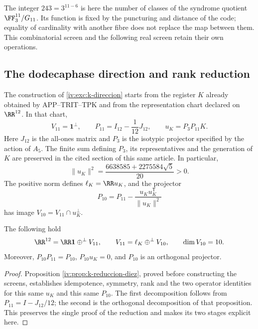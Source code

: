 The integer \(243=3^{11-6}\) is here the number of classes
of the syndrome quotient \(\FF_3^{11}/G_{11}\). Its
function is fixed by the puncturing and distance of the
code; equality of cardinality with another fibre does not replace
the map between them. This combinatorial screen and the
following real screen retain their own operations.

\subsection{The dodecaphase direction and rank reduction}

The construction of \ref{iv:exc:k-direccion} starts from the register
\(K\) already obtained by APP--TRIT--TPK and from the representation
chart declared on \(\RR^{12}\). In that chart,
\begin{equation}
 V_{11}=\mathbf1^\perp,\qquad
 P_{11}=I_{12}-\frac1{12}J_{12},\qquad
 u_K=P_3P_{11}K.
 \label{iv:iv:eq:p11-uk}
\end{equation}
Here \(J_{12}\) is the all-ones matrix and \(P_3\) is the
isotypic projector specified by the action of \(A_5\).
The finite sum defining \(P_3\), its representatives and the
generation of \(K\) are preserved in the cited section of
this same article. In particular,
\[
 \|u_K\|^2=\frac{6638585+2275584\sqrt5}{20}>0.
\]
The positive norm defines \(\ell_K=\RR u_K\), and the
projector
\begin{equation}
 P_{10}=P_{11}-\frac{u_Ku_K^{\mathsf T}}{\|u_K\|^2}
 \label{iv:iv:eq:p10}
\end{equation}
has image \(V_{10}=V_{11}\cap u_K^\perp\).

\begin{proposition}
\label{iv:iv:prop:12-11-10}
The following hold
\[
 \RR^{12}=\RR\mathbf1\mathbin{\oplus^\perp}V_{11},\qquad
 V_{11}=\ell_K\mathbin{\oplus^\perp}V_{10},\qquad
 \dim V_{10}=10.
\]
Moreover, \(P_{10}P_{11}=P_{10}\), \(P_{10}u_K=0\), and
\(P_{10}\) is an orthogonal projector.
\end{proposition}
\begin{proof}
Proposition \ref{iv:prop:k-reduccion-diez}, proved before
constructing the screens, establishes idempotence, symmetry, rank and
the two operator identities for this same \(u_K\) and this same
\(P_{10}\). The first decomposition follows from
\(P_{11}=I-J_{12}/12\); the second is the orthogonal decomposition
of that proposition. This preserves the single proof of the
reduction and makes its two stages explicit here.
\end{proof}

